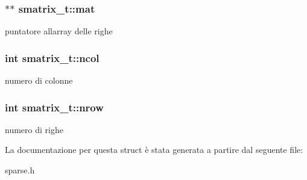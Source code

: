 \subsubsection[{\texorpdfstring{mat}{mat}}]{$\ast$$\ast$ smatrix\+\_\+t\+::mat}\hypertarget{structsmatrix__t_aa60ccb45be474ec81f6daab4fcdab2c4}{}\label{structsmatrix__t_aa60ccb45be474ec81f6daab4fcdab2c4}
puntatore all\textquotesingle{}array delle righe 
\subsubsection[{\texorpdfstring{ncol}{ncol}}]{\setlength{\rightskip}{0pt plus 5cm}int smatrix\+\_\+t\+::ncol}\hypertarget{structsmatrix__t_a7a7218430298fc18a42dfa43ecc41635}{}\label{structsmatrix__t_a7a7218430298fc18a42dfa43ecc41635}
numero di colonne 
\subsubsection[{\texorpdfstring{nrow}{nrow}}]{\setlength{\rightskip}{0pt plus 5cm}int smatrix\+\_\+t\+::nrow}\hypertarget{structsmatrix__t_ae0b8f31ddab7ed23ca14a46758291f37}{}\label{structsmatrix__t_ae0b8f31ddab7ed23ca14a46758291f37}
numero di righe 

La documentazione per questa struct è stata generata a partire dal seguente file\+:\begin{DoxyCompactItemize}
\item 
sparse.\+h\end{DoxyCompactItemize}

